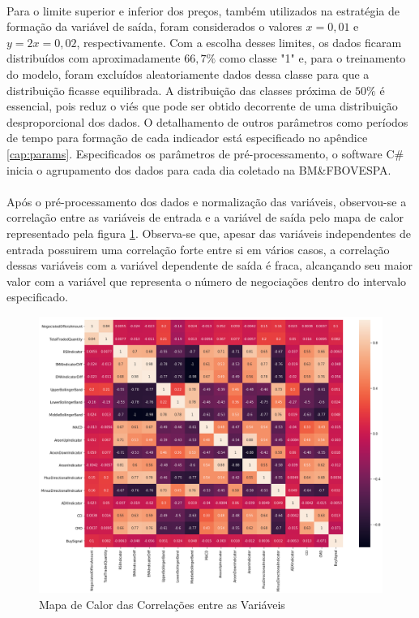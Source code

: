 \documentclass[grad,numbers]{coppe}
\begin{document}
        \paragraph{}Para o limite superior e inferior dos preços, também utilizados na estratégia de formação da variável de saída, foram considerados o valores $x = 0,01$ e $y = 2x = 0,02$, respectivamente. Com a escolha desses limites, os dados ficaram distribuídos com aproximadamente $66,7\%$ como classe "1" e, para o treinamento do modelo, foram excluídos aleatoriamente dados dessa classe para que a distribuição ficasse equilibrada. A distribuição das classes próxima de $50\%$ é essencial, pois reduz o viés que pode ser obtido decorrente de uma distribuição desproporcional dos dados. O detalhamento de outros parâmetros como períodos de tempo para formação de cada indicador está especificado no apêndice \ref{cap:params}. Especificados os parâmetros de pré-processamento, o software C\# inicia o agrupamento dos dados para cada dia coletado na BM\&FBOVESPA.
        
        \paragraph{}Após o pré-processamento dos dados e normalização das variáveis, observou-se a correlação entre as variáveis de entrada e a variável de saída pelo mapa de calor representado pela figura \ref{img:heatmap}. Observa-se que, apesar das variáveis independentes de entrada possuirem uma correlação forte entre si em vários casos, a correlação dessas variáveis com a variável dependente de saída é fraca, alcançando seu maior valor com a variável que representa o número de negociações dentro do intervalo especificado. 
        
        \begin{figure}[h]
            \caption{Mapa de Calor das Correlações entre as Variáveis}
            \label{img:heatmap}
            \includegraphics[width=15cm]{corr.png}
            \centering
        \end{figure}
        
\end{document}
